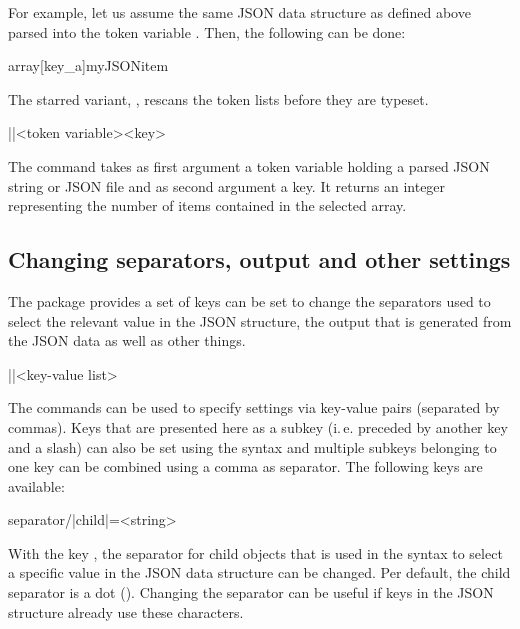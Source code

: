 \documentclass[a4paper]{article}
\begin{document}
{{For example, let us assume the same JSON data structure as defined above parsed into the token variable \macro{\myJSONdata}. Then, the following can be done:


\begin{codeexamplecolumns}
\newcommand{\myJSONitem}{
  \item \emph{\JSONParseArrayValue}
}

\begin{itemize}
  \JSONParseArrayValuesMap{\myJSONdata}
    {array}[key_a]{myJSONitem}
\end{itemize}
\end{codeexamplecolumns}

The starred variant, \macro{\JSONParseArrayValuesMap*}, rescans the token lists before they are typeset. 

\begin{macrodef}
|\JSONParseArrayCount|{<token variable>}{<key>}
\end{macrodef}
The command \macro{\JSONParseArrayCount} takes as first argument a token variable holding a parsed JSON string or JSON file and as second argument a key. It returns an integer representing the number of items contained in the selected array.

\subsection{Changing separators, output and other settings}\label{sec:settings}

The package provides a set of keys can be set to change the separators used to select the relevant value in the JSON structure, the output that is generated from the JSON data as well as other things.

\begin{macrodef}
|\JSONParseSet|{<key-value list>}
\end{macrodef}
The commands \macro{\JSONParseSet} can be used to specify settings via key-value pairs (separated by commas). Keys that are presented here as a subkey (i.\,e. preceded by another key and a slash) can also be set using the syntax  and multiple subkeys belonging to one key can be combined using a comma as separator. The following keys are available:

\begin{macrodef}
separator/|child|={<string>}
\end{macrodef}
With the key , the separator for child objects that is used in the syntax to select a specific value in the JSON data structure can be changed. Per default, the child separator is a dot (). Changing the separator can be useful if keys in the JSON structure already use these characters. 

}}
\end{document}
